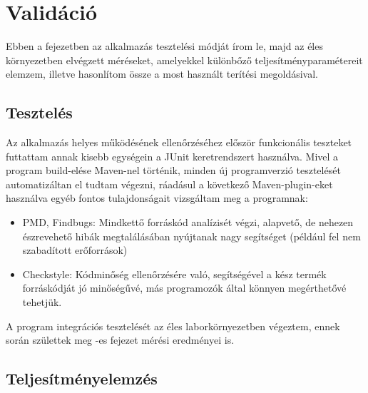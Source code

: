 \chapter{Validáció}
\label{chp:validation}

Ebben a fejezetben az alkalmazás tesztelési módját írom le, majd az éles környezetben elvégzett méréseket, amelyekkel különbőző teljesítményparamétereit elemzem, illetve hasonlítom össze a most használt terítési megoldásival.

\section{Tesztelés}

Az alkalmazás helyes működésének ellenőrzéséhez először funkcionális teszteket futtattam annak kisebb egységein a JUnit\cite{massol2003junit} keretrendszert használva. Mivel a program build-elése Maven-nel\cite{smart2005introduction} történik, minden új programverzió tesztelését automatizáltan el tudtam végezni, ráadásul a következő Maven-plugin-eket használva egyéb fontos tulajdonságait vizsgáltam meg a programnak:

\begin{itemize}
  \item PMD, Findbugs\cite{rutar2004comparison}: Mindkettő forráskód analízisét végzi, alapvető, de nehezen észrevehető hibák megtalálásában nyújtanak nagy segítséget (például fel nem szabadított erőforrások)
  \item Checkstyle\cite{checkstyle}: Kódminőség ellenőrzésére való, segítségével a kész termék forráskódját jó minőségűvé, más programozók által könnyen megérthetővé tehetjük.
\end{itemize}

A program integrációs tesztelését az éles laborkörnyezetben végeztem, ennek során születtek meg -es fejezet mérési eredményei is.

\section{Teljesítményelemzés}
\label{performanceanal}

